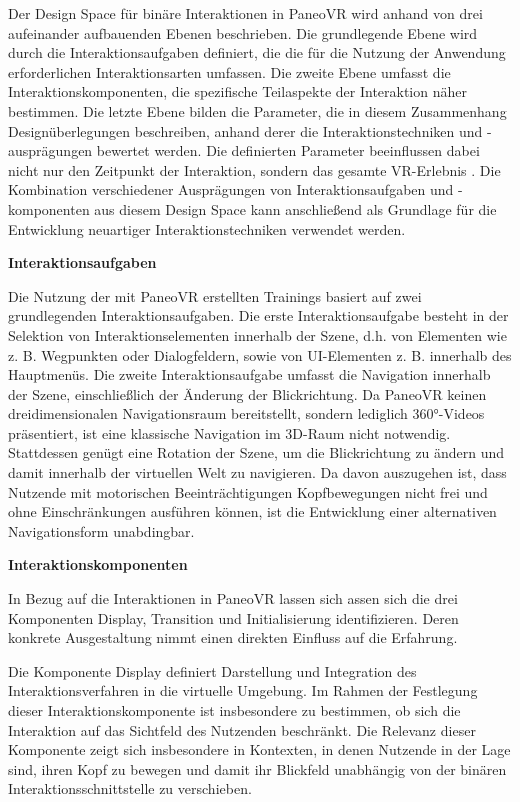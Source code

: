 Der Design Space für binäre Interaktionen in PaneoVR wird anhand von drei aufeinander aufbauenden Ebenen beschrieben. Die grundlegende Ebene wird durch die Interaktionsaufgaben definiert, die die für die Nutzung der Anwendung erforderlichen Interaktionsarten umfassen. Die zweite Ebene umfasst die Interaktionskomponenten, die spezifische Teilaspekte der Interaktion näher bestimmen. Die letzte Ebene bilden die Parameter, die in diesem Zusammenhang Designüberlegungen beschreiben, anhand derer die Interaktionstechniken und -ausprägungen bewertet werden. Die definierten Parameter beeinflussen dabei nicht nur den Zeitpunkt der Interaktion, sondern das gesamte VR-Erlebnis \citep{10.1145/3441852.3471230}. Die Kombination verschiedener Ausprägungen von Interaktionsaufgaben und -komponenten aus diesem Design Space kann anschließend als Grundlage für die Entwicklung neuartiger Interaktionstechniken verwendet werden.

{\normalfont \bfseries Interaktionsaufgaben}  

Die Nutzung der mit PaneoVR erstellten Trainings basiert auf zwei grundlegenden Interaktionsaufgaben. Die erste Interaktionsaufgabe besteht in der Selektion von Interaktionselementen innerhalb der Szene, d.h. von Elementen wie z. B.  Wegpunkten oder Dialogfeldern, sowie von UI-Elementen z. B. innerhalb des Hauptmenüs. Die zweite Interaktionsaufgabe umfasst die Navigation innerhalb der Szene, einschließlich der Änderung der Blickrichtung. Da PaneoVR keinen dreidimensionalen Navigationsraum bereitstellt, sondern lediglich 360°-Videos präsentiert, ist eine klassische Navigation im 3D-Raum nicht notwendig. Stattdessen genügt eine Rotation der Szene, um die Blickrichtung zu ändern und damit innerhalb der virtuellen Welt zu navigieren. Da davon auszugehen ist, dass Nutzende mit motorischen Beeinträchtigungen Kopfbewegungen nicht frei und ohne Einschränkungen ausführen können, ist die Entwicklung einer alternativen Navigationsform unabdingbar. 

{\normalfont \bfseries Interaktionskomponenten} 

In Bezug auf die Interaktionen in PaneoVR lassen sich assen sich die drei Komponenten Display, Transition und Initialisierung identifizieren. Deren konkrete Ausgestaltung nimmt einen direkten Einfluss auf die Erfahrung. 

Die Komponente Display definiert Darstellung und Integration des Interaktionsverfahren in die virtuelle Umgebung. Im Rahmen der Festlegung dieser Interaktionskomponente ist insbesondere zu bestimmen, ob sich die Interaktion auf das Sichtfeld des Nutzenden beschränkt. Die Relevanz dieser Komponente zeigt sich insbesondere in Kontexten, in denen Nutzende in der Lage sind, ihren Kopf zu bewegen und damit ihr Blickfeld unabhängig von der binären Interaktionsschnittstelle zu verschieben.

